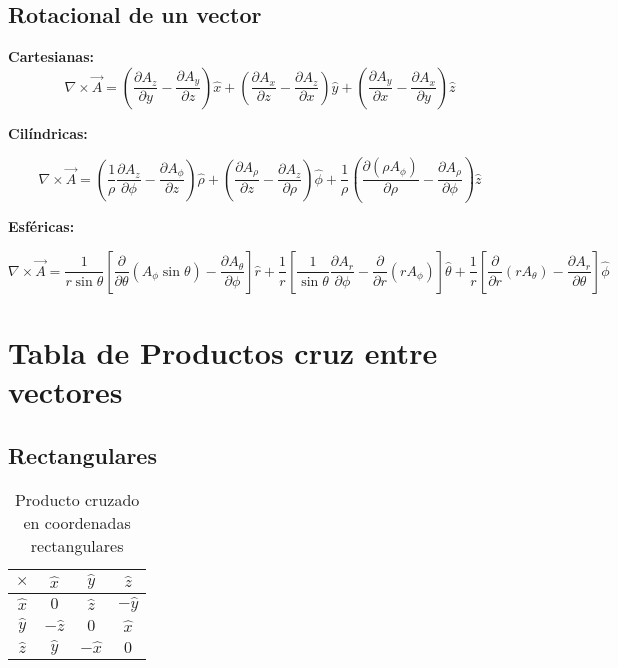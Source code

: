 \documentclass[11pt]{article}
\begin{document}
\subsection{Rotacional de un vector}

\textbf{Cartesianas:}
\[
\nabla \times \vec{A} =
\left( \frac{\partial A_z}{\partial y} - \frac{\partial A_y}{\partial z} \right) \hat{x}
+ \left( \frac{\partial A_x}{\partial z} - \frac{\partial A_z}{\partial x} \right) \hat{y}
+ \left( \frac{\partial A_y}{\partial x} - \frac{\partial A_x}{\partial y} \right) \hat{z}
\]


\textbf{Cilíndricas:}

\[
\nabla \times \vec{A} =
\left( \frac{1}{\rho} \frac{\partial A_z}{\partial \phi} - \frac{\partial A_\phi}{\partial z} \right) \hat{\rho}
+ \left( \frac{\partial A_\rho}{\partial z} - \frac{\partial A_z}{\partial \rho} \right) \hat{\phi}
+ \frac{1}{\rho} \left( \frac{\partial (\rho A_\phi)}{\partial \rho} - \frac{\partial A_\rho}{\partial \phi} \right) \hat{z}
\]



\textbf{Esféricas:}

\[
\nabla \times \vec{A} =
\frac{1}{r \sin\theta}
\left[
\frac{\partial}{\partial \theta} (A_\phi \sin\theta) - \frac{\partial A_\theta}{\partial \phi}
\right] \hat{r}
+ \frac{1}{r}
\left[
\frac{1}{\sin\theta} \frac{\partial A_r}{\partial \phi} - \frac{\partial}{\partial r}(r A_\phi)
\right] \hat{\theta}
+ \frac{1}{r}
\left[
\frac{\partial}{\partial r}(r A_\theta) - \frac{\partial A_r}{\partial \theta}
\right] \hat{\phi}
\]


\section{Tabla de Productos cruz entre vectores}
\subsection{Rectangulares}
\begin{table}[H]
\centering
\begin{tabular}{c|ccc}
$\times$ & $\hat{x}$ & $\hat{y}$ & $\hat{z}$ \\
\hline
$\hat{x}$ & $0$ & $\hat{z}$ & $-\hat{y}$ \\
$\hat{y}$ & $-\hat{z}$ & $0$ & $\hat{x}$ \\
$\hat{z}$ & $\hat{y}$ & $-\hat{x}$ & $0$
\end{tabular}
\caption{Producto cruzado en coordenadas rectangulares}
\end{table}
\end{document}
